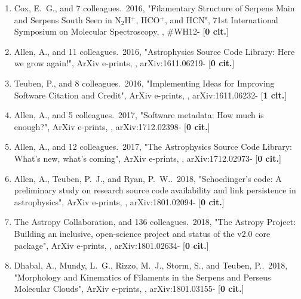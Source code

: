 \documentclass[11pt,letterpaper]{article}
\begin{document}
\begin{enumerate}[resume,label=\textbf{\arabic*}.]
\item  
Cox, E.~G., and 7 colleagues.\  2016,  "Filamentary Structure of Serpens 
Main and Serpens South Seen in N$_{2}$H$^{+}$, HCO$^{+}$, and HCN", 71st 
International Symposium on Molecular Spectroscopy,  , \#WH12- [{\bf 0 
cit.}] 

\item  
Allen, A., and 11 colleagues.\  2016,  "Astrophysics Source Code Library: 
Here we grow again!", ArXiv e-prints,  , arXiv:1611.06219- [{\bf 0 cit.}] 

\item  
Teuben, P., and 8 colleagues.\  2016,  "Implementing Ideas for Improving 
Software Citation and Credit", ArXiv e-prints,  , arXiv:1611.06232- [{\bf 1 
cit.}] 



\item  
Allen, A., and 5 colleagues.\  2017,  "Software metadata: How much is 
enough?", ArXiv e-prints,  , arXiv:1712.02398- [{\bf 0 cit.}] 

\item  
Allen, A., and 12 colleagues.\  2017,  "The Astrophysics Source Code 
Library: What's new, what's coming", ArXiv e-prints,  , arXiv:1712.02973- 
[{\bf 0 cit.}] 





\item  
Allen, A., Teuben, P.~J., and Ryan, P.~W..\  2018,  "Schoedinger's code: A 
preliminary study on research source code availability and link persistence 
in astrophysics", ArXiv e-prints,  , arXiv:1801.02094- [{\bf 0 cit.}] 

\item  
The Astropy Collaboration, and 136 colleagues.\  2018,  "The Astropy 
Project: Building an inclusive, open-science project and status of the v2.0 
core package", ArXiv e-prints,  , arXiv:1801.02634- [{\bf 0 cit.}] 

\item  
Dhabal, A., Mundy, L.~G., Rizzo, M.~J., Storm, S., and Teuben, P..\  2018,  
"Morphology and Kinematics of Filaments in the Serpens and Perseus 
Molecular Clouds", ArXiv e-prints,  , arXiv:1801.03155- [{\bf 0 cit.}] 


  

\end{enumerate}
\end{document}
